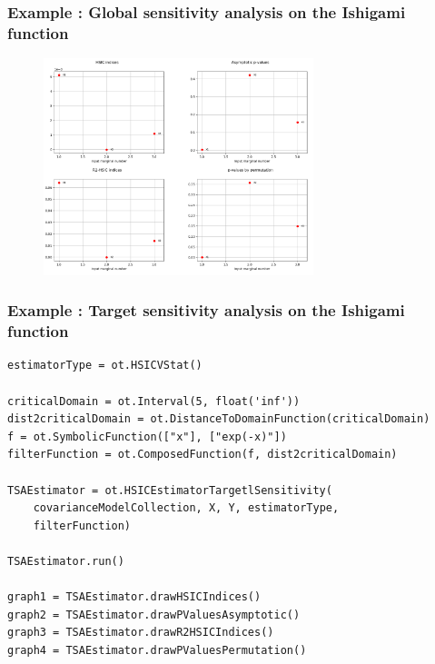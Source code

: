 \documentclass{beamer}
\begin{document}
\begin{frame}
\frametitle{Example : Global sensitivity analysis on the Ishigami function}

\begin{figure}
   \includegraphics[width=0.7\textwidth]{figures/HSIC1.png}
\end{figure}
\end{frame}




\begin{frame}[containsverbatim]	
\frametitle{Example : Target sensitivity analysis on the Ishigami function}
\begin{small}

\begin{lstlisting}
estimatorType = ot.HSICVStat()

criticalDomain = ot.Interval(5, float('inf'))
dist2criticalDomain = ot.DistanceToDomainFunction(criticalDomain)
f = ot.SymbolicFunction(["x"], ["exp(-x)"])
filterFunction = ot.ComposedFunction(f, dist2criticalDomain)

TSAEstimator = ot.HSICEstimatorTargetlSensitivity(
    covarianceModelCollection, X, Y, estimatorType, 
    filterFunction)
    
TSAEstimator.run()

graph1 = TSAEstimator.drawHSICIndices()
graph2 = TSAEstimator.drawPValuesAsymptotic()
graph3 = TSAEstimator.drawR2HSICIndices()
graph4 = TSAEstimator.drawPValuesPermutation()
\end{lstlisting}

\end{small}
\end{frame}
\end{document}
